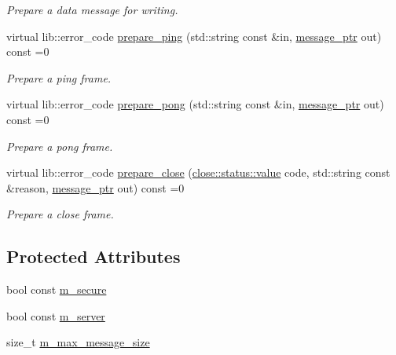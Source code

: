 \begin{DoxyCompactItemize}
\begin{DoxyCompactList}\small\item\em Prepare a data message for writing. \end{DoxyCompactList}\item 
virtual lib\+::error\+\_\+code \hyperlink{classwebsocketpp_1_1processor_1_1processor_a2326bfb2f5a5724de948bd76bf5f07e6}{prepare\+\_\+ping} (std\+::string const \&in, \hyperlink{classwebsocketpp_1_1processor_1_1processor_a7f189eb2eb87b7293d46026fa0950635}{message\+\_\+ptr} out) const  =0
\begin{DoxyCompactList}\small\item\em Prepare a ping frame. \end{DoxyCompactList}\item 
virtual lib\+::error\+\_\+code \hyperlink{classwebsocketpp_1_1processor_1_1processor_af56eddf18cd0c256cacc88f5e34274f1}{prepare\+\_\+pong} (std\+::string const \&in, \hyperlink{classwebsocketpp_1_1processor_1_1processor_a7f189eb2eb87b7293d46026fa0950635}{message\+\_\+ptr} out) const  =0
\begin{DoxyCompactList}\small\item\em Prepare a pong frame. \end{DoxyCompactList}\item 
virtual lib\+::error\+\_\+code \hyperlink{classwebsocketpp_1_1processor_1_1processor_ae41d7cf40e02e54b5228af75330567b7}{prepare\+\_\+close} (\hyperlink{namespacewebsocketpp_1_1close_1_1status_a8614a5c4733d708e2d2a32191c5bef84}{close\+::status\+::value} code, std\+::string const \&reason, \hyperlink{classwebsocketpp_1_1processor_1_1processor_a7f189eb2eb87b7293d46026fa0950635}{message\+\_\+ptr} out) const  =0
\begin{DoxyCompactList}\small\item\em Prepare a close frame. \end{DoxyCompactList}\end{DoxyCompactItemize}
\subsection*{Protected Attributes}
\begin{DoxyCompactItemize}
\item 
bool const \hyperlink{classwebsocketpp_1_1processor_1_1processor_aebab411b1ca4d8ab32ee8c13afcf9274}{m\+\_\+secure}
\item 
bool const \hyperlink{classwebsocketpp_1_1processor_1_1processor_a584edc3698f98e6eb85ab280f491ac9d}{m\+\_\+server}
\item 
size\+\_\+t \hyperlink{classwebsocketpp_1_1processor_1_1processor_a74984af956fccae7e045743cf8ac23b4}{m\+\_\+max\+\_\+message\+\_\+size}
\end{DoxyCompactItemize}


